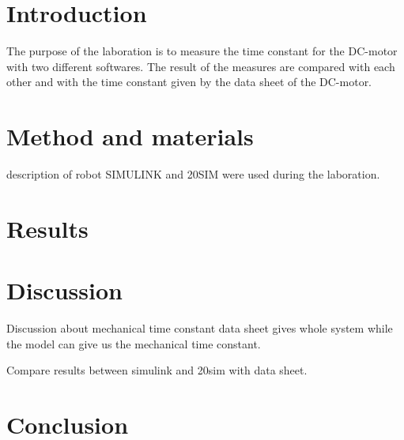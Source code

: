 \documentclass[12pt,a4paper]{article}
\begin{document}
\newpage

\tableofcontents

\newpage

\section{Introduction}
The purpose of the laboration is to measure the time constant for the DC-motor with two different softwares. The result of the measures are compared with each other and with the time constant given by the data sheet of the DC-motor.

\section{Method and materials}
description of robot
SIMULINK and 20SIM were used during the laboration.
\lipsum[4]

\section{Results}
\lipsum[4]

\section{Discussion}
Discussion about mechanical time constant data sheet gives whole system while the model can give us the mechanical time constant.

Compare results between simulink and 20sim with data sheet.
\lipsum[4]

\section{Conclusion}
\lipsum[4]

\begin{thebibliography}{99}

\end{thebibliography}
\end{document}
